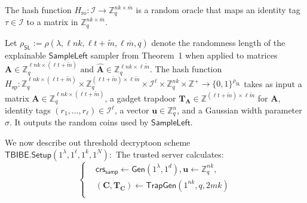 \begin{definition}
The hash function
$
    H_{\mathrm{ro}} : \mathcal{I} \to \mathbb{Z}_q^{nk \times \bar{m}}
$
is a random oracle that maps an identity tag $\tau \in \mathcal{I}$ to a matrix in
$\mathbb{Z}_q^{nk \times \bar{m}}$.
\end{definition}

\begin{definition}
\label{def:hashsp}

Let
$
    \rho_{\mathsf{SL}}
    :=
    \rho(\lambda,\ell nk,\ell t+\widetilde{m},\ell \overline{m},q)
$
denote the randomness length of the explainable $\mathsf{SampleLeft}$ sampler
from Theorem~1 when applied to matrices
$
    \mathbf{A}\in \mathbb{Z}_q^{\ell nk\times(\ell t+\widetilde{m})}
    \text{ and }
    \widehat{\mathbf{A}}\in \mathbb{Z}_q^{\ell nk \times \ell \widetilde{m}} .
$
The hash function
$
    H_{\mathrm{sp}}:
    \mathbb{Z}_q^{\ell nk \times(\ell t+\widetilde{m})}
    \times
    \mathbb{Z}_q^{(\ell t+\widetilde{m})\times \ell \widetilde{m}}
    \times
    \mathcal{I}^{\ell}
    \times
    \mathbb{Z}_q^{nk}
    \times
    \mathbb{Z}^{+}
    \to
    \{0,1\}^{\rho_{\mathsf{SL}}}
$
takes as input a matrix
$\mathbf{A}\in \mathbb{Z}_q^{\ell nk\times(\ell t+\widetilde{m})}$,
a gadget trapdoor
$\mathbf{T}_{\mathbf A}\in
\mathbb{Z}^{(\ell t+\widetilde{m})\times \ell \widetilde{m}}$
for $\mathbf{A}$, identity tags
$(r_1,\ldots,r_\ell)\in\mathcal{I}^{\ell}$,
a vector $\mathbf{u}\in\mathbb{Z}_q^n$, and a Gaussian width parameter
$\sigma$. It outputs the random coins used by $\mathsf{SampleLeft}$.
\end{definition}

\noindent We now describe out threshold decryptoon scheme\\
\vspace{0.4em} 
\noindent$\mathbf{\mathsf{TBIBE.Setup}}(1^\lambda,1^\ell,1^k, 1^N):$ The trusted server calculates:
\[
\left\{
\begin{aligned}
&\mathsf{crs}_{\mathsf{samp}} \leftarrow \mathsf{Gen}(1^\lambda,1^d),
\mathbf u \leftarrow\mathbb Z_q^{nk},\\
&(\mathbf C,\mathbf{T}_{\mathbf{C}}) \leftarrow \mathsf{TrapGen}(1^{nk},q,2mk)\\
\end{aligned}
\right.
\]

